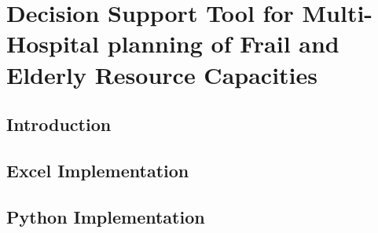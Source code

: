 \documentclass[../thesis.tex]{subfiles}
\begin{document}
\chapter{Decision Support Tool for Multi-Hospital planning of Frail and Elderly Resource Capacities}

\section{Introduction}

\section{Excel Implementation}

\section{Python Implementation}
\end{document}
